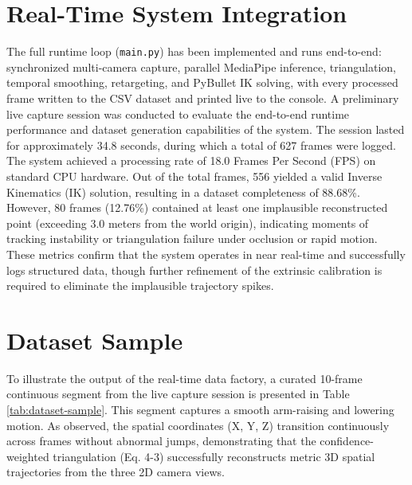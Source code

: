 \section{Real-Time System Integration}

The full runtime loop (\texttt{main.py}) has been implemented and runs
end-to-end: synchronized multi-camera capture, parallel MediaPipe
inference, triangulation, temporal smoothing, retargeting, and PyBullet
IK solving, with every processed frame written to the CSV dataset and
printed live to the console.
A preliminary live capture session was conducted to evaluate the end-to-end runtime performance and dataset generation capabilities of the system. The session lasted for approximately 34.8 seconds, during which a total of 627 frames were logged. The system achieved a processing rate of 18.0 Frames Per Second (FPS) on standard CPU hardware. Out of the total frames, 556 yielded a valid Inverse Kinematics (IK) solution, resulting in a dataset completeness of 88.68\%. However, 80 frames (12.76\%) contained at least one implausible reconstructed point (exceeding 3.0 meters from the world origin), indicating moments of tracking instability or triangulation failure under occlusion or rapid motion. These metrics confirm that the system operates in near real-time and successfully logs structured data, though further refinement of the extrinsic calibration is required to eliminate the implausible trajectory spikes.

\section{Dataset Sample}

To illustrate the output of the real-time data factory, a curated 10-frame continuous segment from the live capture session is presented in Table \ref{tab:dataset-sample}. This segment captures a smooth arm-raising and lowering motion. As observed, the spatial coordinates (X, Y, Z) transition continuously across frames without abnormal jumps, demonstrating that the confidence-weighted triangulation (Eq. 4-3) successfully reconstructs metric 3D spatial trajectories from the three 2D camera views.

